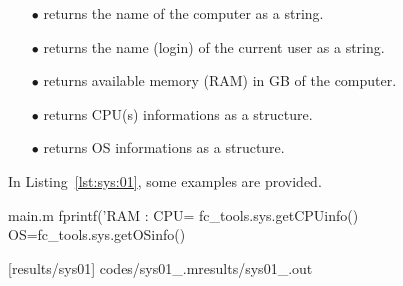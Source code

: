 
\begin{itemize}
\item[$\bullet$]  returns the name of the computer as a string.
\item[$\bullet$]  returns the name (login) of the current user as a string.
\item[$\bullet$]  returns available memory (RAM) in GB of the computer.
\item[$\bullet$]  returns CPU(s) informations as a structure.
\item[$\bullet$]  returns OS informations as a structure.
\end{itemize}

In Listing~\ref{lst:sys:01}, some examples are provided.
\begin{filecontents*}{main.m}
fprintf('RAM : %
CPU= fc_tools.sys.getCPUinfo()
OS=fc_tools.sys.getOSinfo()
\end{filecontents*}
[results/sys01]
%
                      {codes/sys01_\fccmdname\fccmdversionabr.m}{results/sys01_\fccmdname\fccmdversionabr.out}
